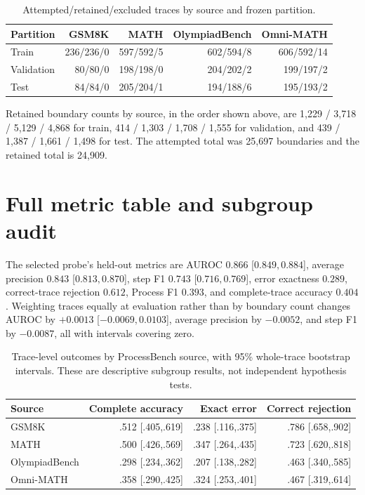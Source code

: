\documentclass{article}
\newcommand{\dataset}{ProcessBench}
\begin{document}
\begin{table}[h]
\centering
\small
\caption{Attempted/retained/excluded traces by source and frozen partition.}
\begin{tabular}{lrrrr}
\toprule
Partition & GSM8K & MATH & OlympiadBench & Omni-MATH \\
\midrule
Train & 236/236/0 & 597/592/5 & 602/594/8 & 606/592/14 \\
Validation & 80/80/0 & 198/198/0 & 204/202/2 & 199/197/2 \\
Test & 84/84/0 & 205/204/1 & 194/188/6 & 195/193/2 \\
\bottomrule
\end{tabular}
\end{table}

Retained boundary counts by source, in the order shown above, are 1,229 / 3,718 / 5,129 / 4,868 for
train, 414 / 1,303 / 1,708 / 1,555 for validation, and 439 / 1,387 / 1,661 / 1,498 for test. The
attempted total was 25,697 boundaries and the retained total is 24,909.

\section{Full metric table and subgroup audit}
\label{app:subgroups}

The selected probe's held-out metrics are AUROC $0.866$ [$0.849,0.884$], average precision $0.843$
[$0.813,0.870$], step F1 $0.743$ [$0.716,0.769$], error exactness $0.289$, correct-trace rejection
$0.612$, Process F1 $0.393$, and complete-trace accuracy $0.404$. Weighting traces equally at
evaluation rather than by boundary count changes AUROC by $+0.0013$ [$-0.0069,0.0103$], average
precision by $-0.0052$, and step F1 by $-0.0087$, all with intervals covering zero.

\begin{table}[h]
\centering
\small
\caption{Trace-level outcomes by \dataset{} source, with 95\% whole-trace bootstrap intervals.
These are descriptive subgroup results, not independent hypothesis tests.}
\begin{tabular}{lrrr}
\toprule
Source & Complete accuracy & Exact error & Correct rejection \\
\midrule
GSM8K & .512 [.405,.619] & .238 [.116,.375] & .786 [.658,.902] \\
MATH & .500 [.426,.569] & .347 [.264,.435] & .723 [.620,.818] \\
OlympiadBench & .298 [.234,.362] & .207 [.138,.282] & .463 [.340,.585] \\
Omni-MATH & .358 [.290,.425] & .324 [.253,.401] & .467 [.319,.614] \\
\bottomrule
\end{tabular}
\end{table}
\end{document}
